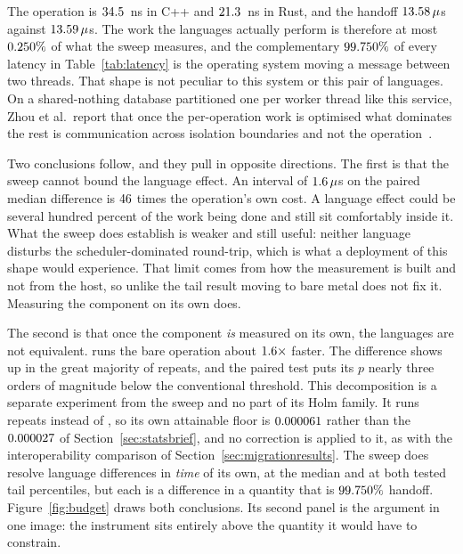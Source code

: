 \documentclass[english,oneside,a4paper,censored,csm,software-track-2020]{HYthesisML}
\begin{document}
The operation is $34.5$~ns in C++ and $21.3$~ns in Rust, and the handoff
$13.58\,\mu$s against $13.59\,\mu$s. The work the languages actually
perform is therefore at most $0.250\%$ of what the sweep measures, and the
complementary $99.750\%$ of every latency in Table~\ref{tab:latency} is the
operating system moving a message between two threads. That shape is not peculiar to this system
or this pair of languages. On a shared-nothing database partitioned one per worker thread like
this service, Zhou et al.\ report that once the per-operation work is optimised what dominates the
rest is communication across isolation boundaries and not the operation~\cite{zhou2025oltp}.

Two conclusions follow, and they pull in opposite directions. The first is that the sweep cannot
bound the language effect. An interval of $1.6\,\mu$s on the paired median difference
is $46$ times the operation's own cost. A language effect could be several hundred
percent of the work being done and still sit comfortably inside it. What the sweep does establish
is weaker and still useful: neither language disturbs the scheduler-dominated round-trip, which
is what a deployment of this shape would experience. That limit comes from how the measurement is
built and not from the host, so unlike the tail result moving to bare metal does not fix it.
Measuring the component on its own does.

The second is that once the component \emph{is} measured on its own, the languages are not
equivalent. \BudgetCoreFaster{} runs the bare operation about $1.6\times$ faster. The
difference shows up in the great majority of repeats, and the paired test puts its $p$ nearly
three orders of magnitude below the conventional threshold. This decomposition is a separate
experiment from the sweep and no part of its Holm family. It runs \BudgetRepeats{} repeats instead
of \NRepeats{}, so its own attainable floor is $0.000061$ rather than the $0.000027$ of
Section~\ref{sec:statsbrief}, and no correction is applied to it, as with the interoperability
comparison of Section~\ref{sec:migrationresults}. The sweep does resolve language differences in
\emph{time} of its own, at the median and at both tested tail percentiles, but each is a
difference in a quantity that is $99.750\%$ handoff. Figure~\ref{fig:budget} draws
both conclusions. Its second panel is the argument in one image: the instrument sits entirely
above the quantity it would have to constrain.
\end{document}
